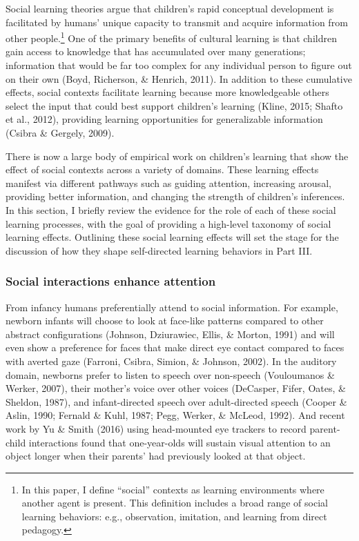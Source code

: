 \documentclass[a4paper,man,apacite,floatsintext]{apa6}
\begin{document}
Social learning theories argue that children's rapid conceptual
development is facilitated by humans' unique capacity to transmit and
acquire information from other people.\footnote{In this paper, I define
  ``social'' contexts as learning environments where another agent is
  present. This definition includes a broad range of social learning
  behaviors: e.g., observation, imitation, and learning from direct
  pedagogy.} One of the primary benefits of cultural learning is that
children gain access to knowledge that has accumulated over many
generations; information that would be far too complex for any
individual person to figure out on their own (Boyd, Richerson, \&
Henrich, 2011). In addition to these cumulative effects, social contexts
facilitate learning because more knowledgeable others select the input
that could best support children's learning (Kline, 2015; Shafto et al.,
2012), providing learning opportunities for generalizable information
(Csibra \& Gergely, 2009).

There is now a large body of empirical work on children's learning that
show the effect of social contexts across a variety of domains. These
learning effects manifest via different pathways such as guiding
attention, increasing arousal, providing better information, and
changing the strength of children's inferences. In this section, I
briefly review the evidence for the role of each of these social
learning processes, with the goal of providing a high-level taxonomy of
social learning effects. Outlining these social learning effects will
set the stage for the discussion of how they shape self-directed
learning behaviors in Part III.

\subsubsection{Social interactions enhance
attention}\label{social-interactions-enhance-attention}

From infancy humans preferentially attend to social information. For
example, newborn infants will choose to look at face-like patterns
compared to other abstract configurations (Johnson, Dziurawiec, Ellis,
\& Morton, 1991) and will even show a preference for faces that make
direct eye contact compared to faces with averted gaze (Farroni, Csibra,
Simion, \& Johnson, 2002). In the auditory domain, newborns prefer to
listen to speech over non-speech (Vouloumanos \& Werker, 2007), their
mother's voice over other voices (DeCasper, Fifer, Oates, \& Sheldon,
1987), and infant-directed speech over adult-directed speech (Cooper \&
Aslin, 1990; Fernald \& Kuhl, 1987; Pegg, Werker, \& McLeod, 1992). And
recent work by Yu \& Smith (2016) using head-mounted eye trackers to
record parent-child interactions found that one-year-olds will sustain
visual attention to an object longer when their parents' had previously
looked at that object.
\end{document}
